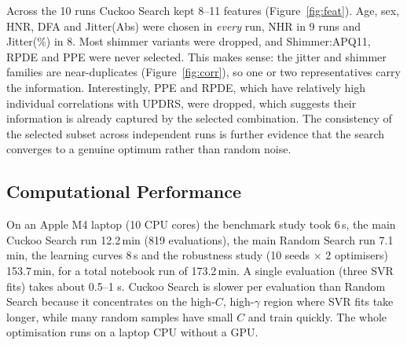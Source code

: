 \documentclass[12pt,a4paper]{article}
\numberwithin{equation}{section}
\numberwithin{table}{section}
\numberwithin{figure}{section}
\begin{document}
Across the 10 runs Cuckoo Search kept 8--11 features (Figure~\ref{fig:feat}). Age, sex, HNR, DFA and Jitter(Abs) were chosen in \emph{every} run, NHR in 9 runs and Jitter(\%) in 8. Most shimmer variants were dropped, and Shimmer:APQ11, RPDE and PPE were never selected. This makes sense: the jitter and shimmer families are near-duplicates (Figure~\ref{fig:corr}), so one or two representatives carry the information. Interestingly, PPE and RPDE, which have relatively high individual correlations with UPDRS, were dropped, which suggests their information is already captured by the selected combination. The consistency of the selected subset across independent runs is further evidence that the search converges to a genuine optimum rather than random noise.

\subsection{Computational Performance}
On an Apple M4 laptop (10 CPU cores) the benchmark study took 6\,s, the main Cuckoo Search run 12.2\,min (819 evaluations), the main Random Search run 7.1\,min, the learning curves 8\,s and the robustness study (10 seeds $\times$ 2 optimisers) 153.7\,min, for a total notebook run of 173.2\,min. A single evaluation (three SVR fits) takes about 0.5--1 s. Cuckoo Search is slower per evaluation than Random Search because it concentrates on the high-$C$, high-$\gamma$ region where SVR fits take longer, while many random samples have small $C$ and train quickly. The whole optimisation runs on a laptop CPU without a GPU.
\end{document}
